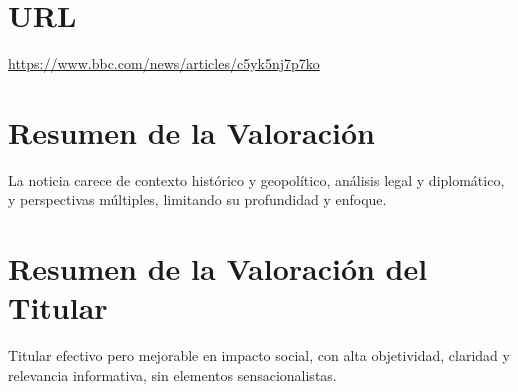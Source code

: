 \documentclass[10pt,a4paper]{article}
\begin{document}
\section*{URL}
\url{ https://www.bbc.com/news/articles/c5yk5nj7p7ko }
\vspace{1em}

\section*{Resumen de la Valoración}
    La noticia carece de contexto hist\'{o}rico y geopol\'{i}tico, an\'{a}lisis legal y diplom\'{a}tico, y perspectivas m\'{u}ltiples, limitando su profundidad y enfoque.
\vspace{1em}

\section*{Resumen de la Valoración del Titular}
    Titular efectivo pero mejorable en impacto social, con alta objetividad, claridad y relevancia informativa, sin elementos sensacionalistas.
\vspace{1em}

\end{document}
